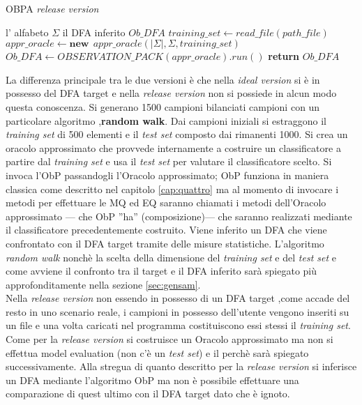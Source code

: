 \begin{algorithm}
\caption{OBPA \textit{release version}}\label{alg:obpar}
\begin{algorithmic}[1]
\Statex
\Input l' alfabeto $\Sigma$
\Output il \ac{DFA} inferito $Ob\_DFA$
\State $training\_set \gets read\_file(path\_file)$ 
\State $appr\_oracle \gets \textbf{new}\:\: appr\_oracle(|\Sigma|,\Sigma,training\_set)$
\State $Ob\_DFA \gets OBSERVATION\_PACK(appr\_oracle).run()$
 \State \textbf{return} $Ob\_DFA$
     
\end{algorithmic}
\end{algorithm}

La differenza principale tra le due versioni è che nella \textit{ideal version} si è in possesso del \ac{DFA} target e nella \textit{release version} non si possiede in alcun modo questa conoscenza.  Si generano 1500 campioni bilanciati campioni con un particolare algoritmo ,\textbf{random walk}.  Dai campioni iniziali si estraggono il \textit{training set} di 500 elementi e il \textit{test set} composto dai rimanenti 1000. Si crea un oracolo approssimato che provvede internamente a costruire un classificatore a partire dal \textit{training set} e usa il \textit{test set} per valutare il classificatore scelto. Si invoca l'\ac{ObP} passandogli l'Oracolo approssimato; \ac{ObP} funziona in maniera classica come descritto nel capitolo \ref{cap:quattro} ma al momento di invocare i metodi per effettuare le \ac{MQ} ed \ac{EQ} saranno chiamati i metodi dell'Oracolo approssimato --- che \ac{ObP} ''ha'' (composizione)--- che saranno realizzati mediante il classificatore precedentemente costruito. Viene inferito un \ac{DFA} che viene confrontato con il \ac{DFA} target tramite delle misure statistiche.  L'algoritmo \textit{random walk} nonchè la scelta della dimensione del \textit{training set} e del \textit{test set}  e come avviene il confronto tra il target e il \ac{DFA} inferito sarà spiegato più approfonditamente nella sezione \ref{sec:gensam}.\\
Nella \textit{release version} non essendo in possesso di un \ac{DFA} target ,come accade del resto in uno scenario reale, i campioni in possesso dell'utente vengono inseriti su un file e una volta caricati nel programma costituiscono essi stessi il \textit{training set}. Come per la \textit{release version} si costruisce un Oracolo approssimato ma non si effettua model evaluation (non c'è un \textit{test set}) e il perchè sarà spiegato successivamente. Alla stregua di quanto descritto per la \textit{release version} si inferisce un \ac{DFA} mediante l'algoritmo \ac{ObP} ma non è possibile effettuare una comparazione di quest ultimo con il \ac{DFA} target dato che è ignoto. \\

